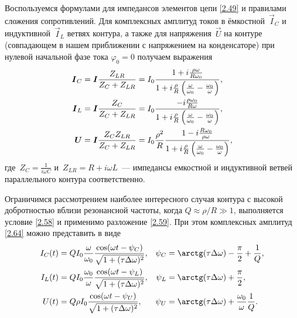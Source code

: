 Воспользуемся формулами для импедансов элементов цепи \eqref{2.49} 
и правилами сложения сопротивлений. Для комплексных амплитуд токов 
в ёмкостной~$\vec I_C$ и индуктивной~$\vec I_L$ ветвях контура, а также для 
напряжения~$\vec U$ на контуре 
(совпадающем в нашем приближении с напряжением на конденсаторе) при
нулевой начальной фазе тока $\varphi_0=0$ получаем выражения
\begin{equation}
\begin{aligned}
	\eqmark{2.64}
			\vec I_C & =\vec
I\dfrac{Z_{LR}}{Z_C+Z_{LR}}=I_0
\dfrac{1+i\frac{\rho\omega}{R\omega_0}}%
{1+i\frac{\rho}{R}\left(\frac{\omega}{\omega_0}-\frac{\omega_0}{\omega}\right)}, \\
			\vec I_L & =\vec
I\dfrac{Z_C}{Z_C+Z_{LR}}=I_0
\dfrac{-i\frac{\rho\omega_0}{R\omega}}%
{1+i\frac{\rho}{R}\left(\frac{\omega}{\omega_0}-\frac{\omega_0}{\omega}\right)}, \\
			\vec U & =\vec
I\dfrac{Z_CZ_{LR}}{Z_C+Z_{LR}}=
I_0\frac{\rho^2}{R}
\dfrac{1-i\frac{R\omega_0}{\rho\omega}}%
{1+i\frac{\rho}{R}\left(\frac{\omega}{\omega_0}-\frac{\omega_0}{\omega}\right)},
\end{aligned}
\end{equation}
где~$Z_C=\frac{1}{i\omega C}$ и~$Z_{LR}=R+i\omega L$~--- импедансы емкостной и индуктивной ветвей параллельного
контура соответственно.

Ограничимся рассмотрением наиболее интересного случая контура с высокой
добротностью вблизи резонансной частоты, когда 
$Q\approx \rho/R\gg1$, выполняется
условие \eqref{2.58} и применимо разложение \eqref{2.59}. При этом
 комплексных амплитуд \eqref{2.64}
можно представить в виде
\begin{equation}
\eqmark{2.65}
\begin{aligned}
			I_C(t)&=QI_0\dfrac{\omega}{\omega_0}\dfrac{\cos(\omega
t-\psi_C)}{\sqrt{1+(\tau\Delta\omega)^2}}, &
\psi_C&=\arctg(\tau\Delta\omega)-\dfrac{\pi}{2}+\frac1Q,\\
			I_L(t)&=QI_0\dfrac{\omega_0}{\omega}\dfrac{\cos(\omega
t-\psi_L)}{\sqrt{1+(\tau\Delta\omega)^2}}, &
\psi_L&=\arctg(\tau\Delta\omega)+\dfrac{\pi}{2},\\
			U(t)&=Q\rho I_0\dfrac{\cos(\omega
t-\psi_U)}{\sqrt{1+(\tau\Delta\omega)^2}}, &
\psi_U&=\arctg(\tau\Delta\omega)+\frac{\omega_0}{\omega}\frac1Q.
\end{aligned}
\end{equation}

